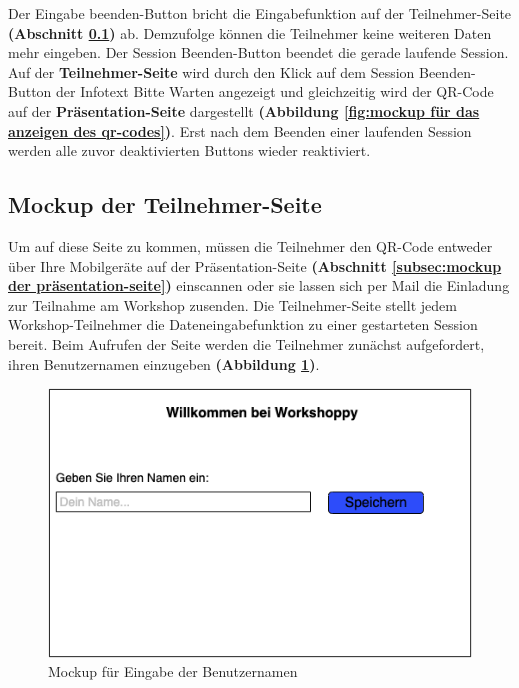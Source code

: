 \begin{enumerate}
Der \glqq Eingabe beenden\grqq{}-Button bricht die Eingabefunktion auf der Teilnehmer-Seite \textbf{(Abschnitt \ref{subsec:Mockup der Teilnehmer-Seite})} ab. Demzufolge können die Teilnehmer keine weiteren Daten mehr eingeben. Der \glqq Session Beenden\grqq{}-Button beendet die gerade laufende Session. Auf der \textbf{Teilnehmer-Seite} wird durch den Klick auf dem \glqq Session Beenden\grqq{}-Button der Infotext \glqq Bitte Warten\grqq{} angezeigt und gleichzeitig wird der QR-Code auf der \textbf{Präsentation-Seite} dargestellt \textbf{(Abbildung \ref{fig:mockup für das anzeigen des qr-codes})}. Erst nach dem Beenden einer laufenden Session werden alle zuvor deaktivierten Buttons wieder reaktiviert.
\end{enumerate}

\subsection{Mockup der Teilnehmer-Seite}
\label{subsec:Mockup der Teilnehmer-Seite}
Um auf diese Seite zu kommen, müssen die Teilnehmer den QR-Code entweder über Ihre Mobilgeräte auf der Präsentation-Seite \textbf{(Abschnitt \ref{subsec:mockup der präsentation-seite})} einscannen oder sie lassen sich per Mail die Einladung zur Teilnahme am Workshop zusenden. Die Teilnehmer-Seite stellt jedem Workshop-Teilnehmer die Dateneingabefunktion zu einer gestarteten Session bereit. Beim Aufrufen der Seite werden die Teilnehmer zunächst aufgefordert, ihren Benutzernamen einzugeben \textbf{(Abbildung \ref{fig:mockup für eingabe der benutzernamen})}.

\begin{figure}[H]
  \begin{center}
    \includegraphics[scale=0.45]{img/teilnehmerseite}
	\caption{Mockup für Eingabe der Benutzernamen}  
	\label{fig:mockup für eingabe der benutzernamen}
  \end{center}   
\end{figure}


